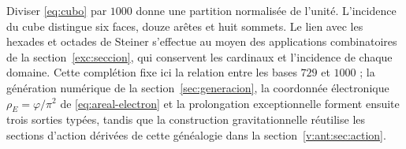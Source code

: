 Diviser \eqref{eq:cubo} par \(1000\) donne une partition normalisée de l'unité. L'incidence du cube distingue six faces, douze arêtes et huit sommets. Le lien avec les hexades et octades de Steiner s'effectue au moyen des applications combinatoires de la section~\ref{exc:seccion}, qui conservent les cardinaux et l'incidence de chaque domaine. Cette complétion fixe ici la relation entre les bases \(729\) et \(1000\) ; la génération numérique de la section~\ref{sec:generacion}, la coordonnée électronique \(\rho_E=\varphi/\pi^2\) de \eqref{eq:areal-electron} et la prolongation exceptionnelle forment ensuite trois sorties typées, tandis que la construction gravitationnelle réutilise les sections d'action dérivées de cette généalogie dans la section~\ref{v:ant:sec:action}.





